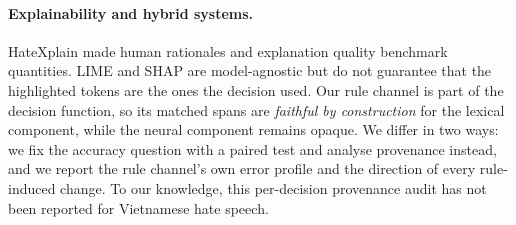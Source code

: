 \paragraph{Explainability and hybrid systems.}
HateXplain \cite{mathew2021hatexplain} made human rationales and explanation quality
benchmark quantities. LIME \cite{ribeiro2016why} and SHAP
\cite{lundberg2017shap} are model-agnostic but do not guarantee that the highlighted
tokens are the ones the decision used. Our rule channel is part of the decision
function, so its matched spans are \emph{faithful by construction} for the lexical
component, while the neural component remains opaque. We differ in two ways: we fix
the accuracy question with a paired test and analyse provenance instead, and we
report the rule channel's own error profile and the direction of every rule-induced
change. To our knowledge, this per-decision provenance audit has not been reported
for Vietnamese hate speech.
